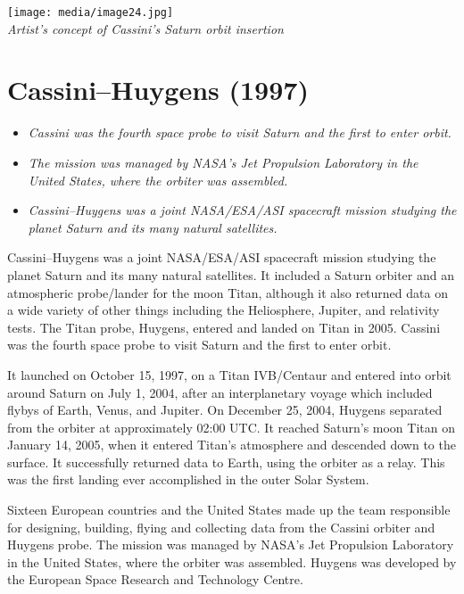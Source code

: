 \texttt{[image: media/image24.jpg]}\\
\emph{Artist's concept of Cassini's Saturn orbit insertion}

\section{Cassini--Huygens (1997)}\label{cassinihuygens-1997}

\begin{itemize}
\item
  \emph{Cassini was the fourth space probe to visit Saturn and the first
  to enter orbit.}
\item
  \emph{The mission was managed by NASA's Jet Propulsion Laboratory in
  the United States, where the orbiter was assembled.}
\item
  \emph{Cassini--Huygens was a joint NASA/ESA/ASI spacecraft mission
  studying the planet Saturn and its many natural satellites.}
\end{itemize}

Cassini--Huygens was a joint NASA/ESA/ASI spacecraft mission studying
the planet Saturn and its many natural satellites. It included a Saturn
orbiter and an atmospheric probe/lander for the moon Titan, although it
also returned data on a wide variety of other things including the
Heliosphere, Jupiter, and relativity tests. The Titan probe, Huygens,
entered and landed on Titan in 2005. Cassini was the fourth space probe
to visit Saturn and the first to enter orbit.

It launched on October 15, 1997, on a Titan IVB/Centaur and entered into
orbit around Saturn on July 1, 2004, after an interplanetary voyage
which included flybys of Earth, Venus, and Jupiter. On December 25,
2004, Huygens separated from the orbiter at approximately 02:00 UTC. It
reached Saturn's moon Titan on January 14, 2005, when it entered Titan's
atmosphere and descended down to the surface. It successfully returned
data to Earth, using the orbiter as a relay. This was the first landing
ever accomplished in the outer Solar System.

Sixteen European countries and the United States made up the team
responsible for designing, building, flying and collecting data from the
Cassini orbiter and Huygens probe. The mission was managed by NASA's Jet
Propulsion Laboratory in the United States, where the orbiter was
assembled. Huygens was developed by the European Space Research and
Technology Centre.

